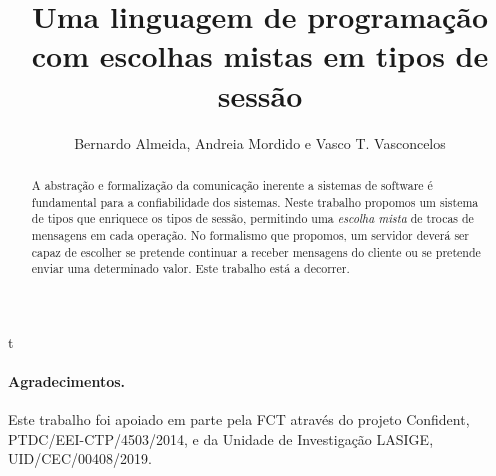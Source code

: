 \documentclass[runningheads]{llncs}
\title{Uma linguagem de programação com escolhas mistas em tipos de sessão}
\author{Bernardo Almeida, Andreia Mordido e Vasco T. Vasconcelos}
\institute{LASIGE, Faculdade de Ciências, Universidade de Lisboa, Portugal}
\begin{document}
\maketitle

\begin{abstract}

A abstração e formalização da comunicação inerente a 
sistemas de software é fundamental para a confiabilidade dos 
sistemas.
Neste trabalho propomos um sistema de tipos que enriquece
os tipos de sessão, permitindo uma 
\emph{escolha mista} de trocas de mensagens em cada operação.
No formalismo que propomos, um servidor deverá ser capaz de escolher se
pretende continuar a receber mensagens do cliente ou se pretende
enviar uma determinado valor. Este trabalho está a decorrer.


\end{abstract}

t
% 


\paragraph{Agradecimentos.}

Este trabalho foi apoiado em parte pela FCT através do projeto
Confident, PTDC/EEI-CTP/4503/2014, e da Unidade de Investigação LASIGE,
UID/CEC/00408/2019.



\end{document}
